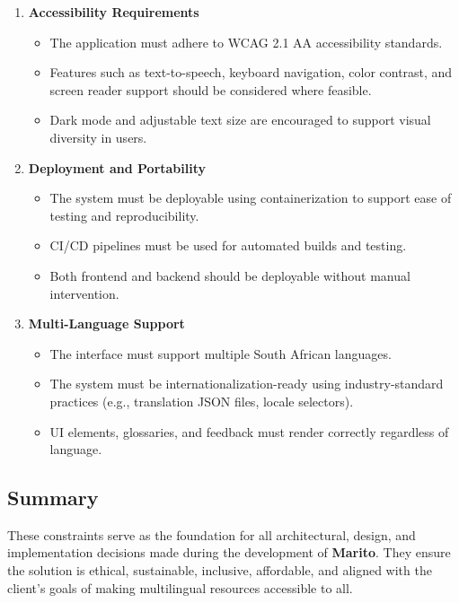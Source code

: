 \documentclass[12pt]{article}
\begin{document}
\begin{enumerate}[label=2.\arabic*, leftmargin=2.5em]
    \item \textbf{Accessibility Requirements}
    \begin{itemize}
        \item The application must adhere to WCAG 2.1 AA accessibility standards.
        \item Features such as text-to-speech, keyboard navigation, color contrast, and screen reader support should be considered where feasible.
        \item Dark mode and adjustable text size are encouraged to support visual diversity in users.
    \end{itemize}

    \item \textbf{Deployment and Portability}
    \begin{itemize}
        \item The system must be deployable using containerization to support ease of testing and reproducibility.
        \item CI/CD pipelines must be used for automated builds and testing.
        \item Both frontend and backend should be deployable without manual intervention.
    \end{itemize}

    \item \textbf{Multi-Language Support}
    \begin{itemize}
        \item The interface must support multiple South African languages.
        \item The system must be internationalization-ready using industry-standard practices (e.g., translation JSON files, locale selectors).
        \item UI elements, glossaries, and feedback must render correctly regardless of language.
    \end{itemize}

\end{enumerate}

\subsection{Summary}
These constraints serve as the foundation for all architectural, design, and implementation decisions made during the development of \textbf{Marito}. They ensure the solution is ethical, sustainable, inclusive, affordable, and aligned with the client’s goals of making multilingual resources accessible to all.
\end{document}
